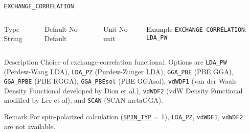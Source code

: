\documentclass[xcolor=dvipsnames,t]{beamer}
\begin{document}
\begin{frame}[allowframebreaks]{\texttt{EXCHANGE\_CORRELATION}} \label{EXCHANGE_CORRELATION}
\vspace*{-12pt}
\begin{columns}
\begin{block}{Type}
String
\end{block}

\begin{block}{Default}
No Default
\end{block}

\begin{block}{Unit}
No unit
\end{block}

\begin{block}{Example}
\texttt{EXCHANGE\_CORRELATION}: \texttt{LDA\_PW}
\end{block}
\end{columns}

\begin{block}{Description}
Choice of exchange-correlation functional. Options are \texttt{LDA\_PW} (Perdew-Wang LDA), \texttt{LDA\_PZ} (Purdew-Zunger LDA), \texttt{GGA\_PBE} (PBE GGA), \texttt{GGA\_RPBE} (PBE RGGA), \texttt{GGA\_PBEsol} (PBE GGAsol), \texttt{vdWDF1} (van der Waals Density Functional developed by Dion et al.), \texttt{vdWDF2} (vdW Density Functional modified by Lee et al), and \texttt{SCAN} (SCAN metaGGA).
\end{block}

\begin{block}{Remark}
For spin-polarized calculation (\hyperlink{SPIN_TYP}{\texttt{SPIN\_TYP}} = 1), \texttt{LDA\_PZ}, \texttt{vdWDF1},  \texttt{vdWDF2} are not available.
\end{block}

\end{frame}
\end{document}
